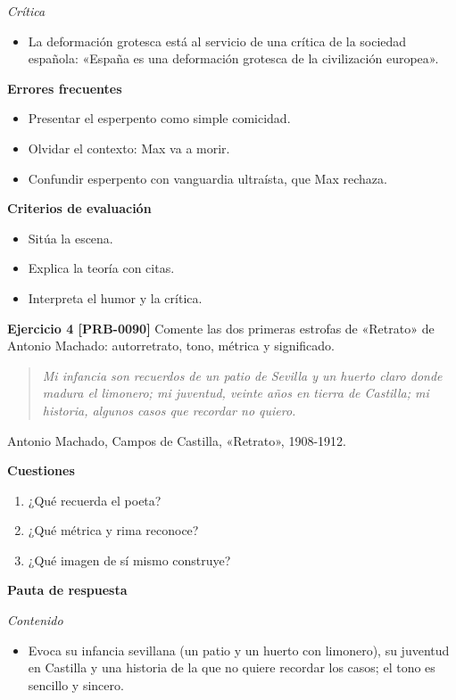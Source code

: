 \documentclass{book}
\begin{document}
\noindent\textit{Crítica}
\begin{itemize}
\item La deformación grotesca está al servicio de una crítica de la sociedad española: «España es una deformación grotesca de la civilización europea».
\end{itemize}

\noindent\textbf{Errores frecuentes}
\begin{itemize}
\item Presentar el esperpento como simple comicidad.
\item Olvidar el contexto: Max va a morir.
\item Confundir esperpento con vanguardia ultraísta, que Max rechaza.
\end{itemize}

\noindent\textbf{Criterios de evaluación}
\begin{itemize}
\item Sitúa la escena.
\item Explica la teoría con citas.
\item Interpreta el humor y la crítica.
\end{itemize}

\noindent\textbf{Ejercicio 4 [PRB-0090]}
Comente las dos primeras estrofas de «Retrato» de Antonio Machado: autorretrato, tono, métrica y significado.


\begin{quote}
\itshape Mi infancia son recuerdos de un patio de Sevilla y un huerto claro donde madura el limonero; mi juventud, veinte años en tierra de Castilla; mi historia, algunos casos que recordar no quiero.
\end{quote}
{\noindent\footnotesize Antonio Machado, Campos de Castilla, «Retrato», 1908-1912.\par}

\noindent\textbf{Cuestiones}
\begin{enumerate}
\item ¿Qué recuerda el poeta?
\item ¿Qué métrica y rima reconoce?
\item ¿Qué imagen de sí mismo construye?
\end{enumerate}

\noindent\textbf{Pauta de respuesta}

\noindent\textit{Contenido}
\begin{itemize}
\item Evoca su infancia sevillana (un patio y un huerto con limonero), su juventud en Castilla y una historia de la que no quiere recordar los casos; el tono es sencillo y sincero.
\end{itemize}
\end{document}
